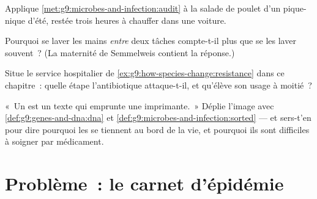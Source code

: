 \begin{exercise}[$\star\star$]\label{exo:g9:microbes-and-infection:9}
Applique \cref{met:g9:microbes-and-infection:audit} à la
salade de poulet d'un pique-nique d'été, restée trois heures
à chauffer dans une voiture.
\end{exercise}

\begin{exercise}[$\star\star$]\label{exo:g9:microbes-and-infection:10}
Pourquoi se laver les mains \emph{entre} deux tâches
compte-t-il plus que se les laver souvent~? (La maternité de
Semmelweis contient la réponse.)
\end{exercise}

\begin{exercise}[$\star\star$]\label{exo:g9:microbes-and-infection:11}
Situe le service hospitalier de
\cref{ex:g9:how-species-change:resistance} dans ce
chapitre~: quelle étape l'antibiotique attaque-t-il, et
qu'élève son usage à moitié~?
\end{exercise}

\begin{exercise}[$\star\star\star$]\label{exo:g9:microbes-and-infection:12}
«~Un  est un texte qui emprunte une imprimante.~»
Déplie l'image avec \cref{def:g9:genes-and-dna:dna} et
\cref{def:g9:microbes-and-infection:sorted} --- et sers-t'en
pour dire pourquoi les  se tiennent au bord de la vie,
et pourquoi ils sont difficiles à soigner par médicament.
\end{exercise}

\section{Problème~: le carnet d'épidémie}

